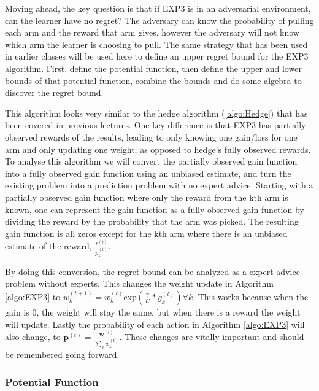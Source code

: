 \documentclass[11pt]{article}
\begin{document}
Moving ahead, the key question is that if EXP3 is in an adversarial environment, can the learner have no regret? The adversary can know the probability of pulling each arm and the reward that arm gives, however the adversary will not know which arm the learner is choosing to pull. The same strategy that has been used in earlier classes will be used here to define an upper regret bound for the EXP3 algorithm. First, define the potential function, then define the upper and lower bounds of that potential function, combine the bounds and do some algebra to discover the regret bound. 

This algorithm looks very similar to the hedge algorithm (\ref{algo:Hedge}) that has been covered in previous lectures. One key difference is that EXP3 has partially observed rewards of the results, leading to only knowing one gain/loss for one arm and only updating one weight, as opposed to hedge's fully observed rewards. To analyse this algorithm we will convert the partially observed gain function into a fully observed gain function using an unbiased estimate, and turn the existing problem into a prediction problem with no expert advice. Starting with a partially observed gain function where only the reward from the kth arm is known, one can represent the gain function as a fully observed gain function by dividing the reward by the probability that the arm was picked. The resulting gain function is all zeros except for the kth arm where there is an unbiased estimate of the reward, $\frac{r^{(t)}}{p_k^{(t)}}$. 

By doing this conversion, the regret bound can be analyzed as a expert advice problem without experts. This changes the weight update in Algorithm \ref{algo:EXP3} to $w_k^{(t+1)}=w_k^{(t)}$exp$(\frac{\gamma}{K}*g_k^{(t)}) \forall k$. This works because when the gain is 0, the weight will stay the same, but when there is a reward the weight will update. Lastly the probability of each action in Algorithm \ref{algo:EXP3} will also change, to $\textbf{p}^{(t)}=\frac{\textbf{w}^{(t)}}{\sum_kw_k^{(t)}}$. These changes are vitally important and should be remembered going forward.

\subsubsection{Potential Function}
\end{document}

